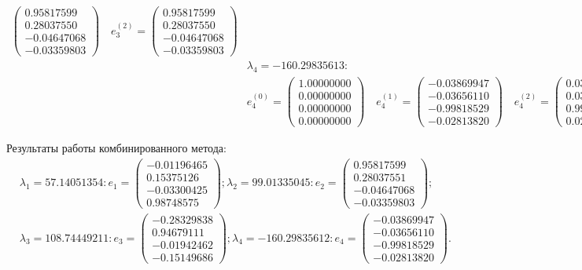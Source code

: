 \documentclass[12pt, a4paper]{article}
\begin{document}
\begin{eqnarray*}
\begin{pmatrix}
			0.95817599 \\ 0.28037550 \\-0.04647068 \\-0.03359803
		\end{pmatrix} \quad e_3^{(2)} = \begin{pmatrix}
			0.95817599 \\ 0.28037550 \\-0.04647068 \\-0.03359803
		\end{pmatrix} \\
		& \lambda_4 = -160.29835613:\\
		& e_4^{(0)} = \begin{pmatrix}
			1.00000000 \\ 0.00000000 \\ 0.00000000 \\ 0.00000000
		\end{pmatrix} \quad e_4^{(1)} = \begin{pmatrix}
			-0.03869947 \\-0.03656110 \\-0.99818529 \\-0.02813820
		\end{pmatrix} \quad e_4^{(2)} = \begin{pmatrix}
			0.03869947 \\ 0.03656110 \\ 0.99818529 \\ 0.02813820
		\end{pmatrix}
	\end{eqnarray*}
	
	Результаты работы комбинированного метода:
	\begin{eqnarray*}
		& \lambda_1 = 57.14051354: e_1 = \begin{pmatrix}
			-0.01196465	\\ 0.15375126	\\ -0.03300425	\\ 0.98748575
		\end{pmatrix}; \lambda_2 = 99.01335045: e_2 = \begin{pmatrix}
			0.95817599	\\ 0.28037551	\\ -0.04647068	\\ -0.03359803
		\end{pmatrix}; \\
		& \lambda_3 = 108.74449211: e_3 = \begin{pmatrix}
			-0.28329838	\\ 0.94679111	\\ -0.01942462	\\ -0.15149686
		\end{pmatrix}; \lambda_4 = -160.29835612: e_4 = \begin{pmatrix}
			-0.03869947	\\ -0.03656110	\\ -0.99818529	\\ -0.02813820
		\end{pmatrix}.
	\end{eqnarray*}
	
\end{document}
